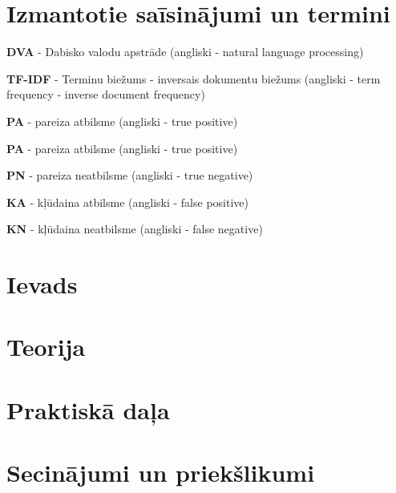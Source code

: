 \documentclass{VEA}
\begin{document}
\chapter*{Izmantotie saīsinājumi un termini}

\textbf{DVA} - Dabisko valodu apstrāde (angliski - natural language processing)

\textbf{TF-IDF} - Terminu biežums - inversais dokumentu biežums (angliski - term frequency - inverse document frequency)

\textbf{PA} - pareiza atbilsme (angliski - true positive)

\textbf{PA} - pareiza atbilsme (angliski - true positive)

\textbf{PN} - pareiza neatbilsme (angliski - true negative)

\textbf{KA} - kļūdaina atbilsme (angliski - false positive)

\textbf{KN} - kļūdaina neatbilsme (angliski - false negative)

\chapter*{Ievads} %



\chapter{Teorija}


\chapter{Praktiskā daļa}



\chapter*{Secinājumi un priekšlikumi}


\renewcommand{\bibname}{\uppercase{Izmantotās literatūras un avotu saraksts}}


\end{document}
